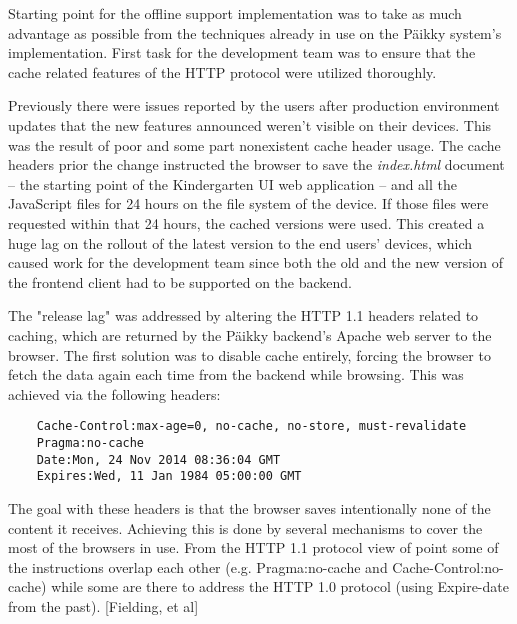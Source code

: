 
Starting point for the offline support implementation was to take as much advantage as possible from the techniques already in use on the Päikky system's implementation. First task for the development team was to ensure that the cache related features of the HTTP protocol were utilized thoroughly.

Previously there were issues reported by the users after production environment updates that the new features announced weren't visible on their devices. This was the result of poor and some part nonexistent cache header usage. The cache headers prior the change instructed the browser to save the \textit{index.html} document – the starting point of the Kindergarten UI web application – and all the JavaScript files for 24 hours on the file system of the device. If those files were requested within that 24 hours, the cached versions were used. This created a huge lag on the rollout of the latest version to the end users' devices, which caused work for the development team since both the old and the new version of the frontend client had to be supported on the backend.

The "release lag" was addressed by altering the HTTP 1.1 headers related to caching, which are returned by the Päikky backend's Apache web server to the browser. The first solution was to disable cache entirely, forcing the browser to fetch the data again each time from the backend while browsing. This was achieved via the following headers:
\begin{lstlisting}
    Cache-Control:max-age=0, no-cache, no-store, must-revalidate
    Pragma:no-cache
    Date:Mon, 24 Nov 2014 08:36:04 GMT
    Expires:Wed, 11 Jan 1984 05:00:00 GMT
\end{lstlisting}
\noindent The goal with these headers is that the browser saves intentionally none of the content it receives. Achieving this is done by several mechanisms to cover the most of the browsers in use. From the HTTP 1.1 protocol view of point some of the instructions overlap each other (e.g. Pragma:no-cache and Cache-Control:no-cache) while some are there to address the HTTP 1.0 protocol (using Expire-date from the past). [Fielding, et al]

